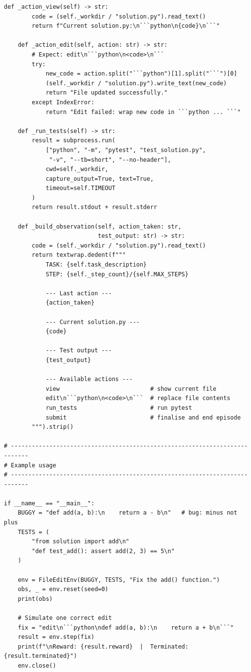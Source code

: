 \begin{lstlisting}[style=pythonstyle, caption={Minimal LLM agent environment following the Gymnasium API.}]
    def _action_view(self) -> str:
        code = (self._workdir / "solution.py").read_text()
        return f"Current solution.py:\n```python\n{code}\n```"

    def _action_edit(self, action: str) -> str:
        # Expect: edit\n```python\n<code>\n```
        try:
            new_code = action.split("```python")[1].split("```")[0]
            (self._workdir / "solution.py").write_text(new_code)
            return "File updated successfully."
        except IndexError:
            return "Edit failed: wrap new code in ```python ... ```"

    def _run_tests(self) -> str:
        result = subprocess.run(
            ["python", "-m", "pytest", "test_solution.py",
             "-v", "--tb=short", "--no-header"],
            cwd=self._workdir,
            capture_output=True, text=True,
            timeout=self.TIMEOUT
        )
        return result.stdout + result.stderr

    def _build_observation(self, action_taken: str,
                           test_output: str) -> str:
        code = (self._workdir / "solution.py").read_text()
        return textwrap.dedent(f"""
            TASK: {self.task_description}
            STEP: {self._step_count}/{self.MAX_STEPS}

            --- Last action ---
            {action_taken}

            --- Current solution.py ---
            {code}

            --- Test output ---
            {test_output}

            --- Available actions ---
            view                          # show current file
            edit\n```python\n<code>\n```  # replace file contents
            run_tests                     # run pytest
            submit                        # finalise and end episode
        """).strip()

# ---------------------------------------------------------------------------
# Example usage
# ---------------------------------------------------------------------------

if __name__ == "__main__":
    BUGGY = "def add(a, b):\n    return a - b\n"   # bug: minus not plus
    TESTS = (
        "from solution import add\n"
        "def test_add(): assert add(2, 3) == 5\n"
    )

    env = FileEditEnv(BUGGY, TESTS, "Fix the add() function.")
    obs, _ = env.reset(seed=0)
    print(obs)

    # Simulate one correct edit
    fix = "edit\n```python\ndef add(a, b):\n    return a + b\n```"
    result = env.step(fix)
    print(f"\nReward: {result.reward}  |  Terminated: {result.terminated}")
    env.close()
\end{lstlisting}

